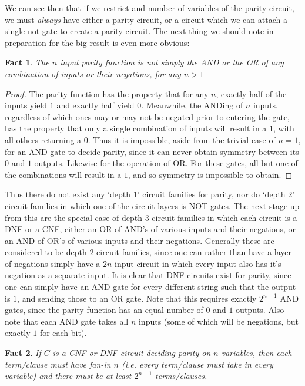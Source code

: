 \documentclass{article}
\theoremstyle{definition}
\theoremstyle{plain}
\theoremstyle{theorem}
\newtheorem{fact}{Fact}[section]
\begin{document}
We can see then that if we restrict and number of variables of the parity circuit, we must \textit{always} have either a parity circuit, or a circuit which we can attach a single not gate to create a parity circuit. The next thing we should note in preparation for the big result is even more obvious: 
\begin{fact}
	The $n$ input parity function is not simply the AND or the OR of any combination of inputs or their negations, for any $n>1$ 
\end{fact}
\begin{proof}
	The parity function has the property that for any $n$, exactly half of the inputs yield $1$ and exactly half yield $0$. Meanwhile, the ANDing of $n$ inputs, regardless of which ones may or may not be negated prior to entering the gate, has the property that only a single combination of inputs will result in a $1$, with all others returning a $0$. Thus it is impossible, aside from the trivial case of $n=1$, for an AND gate to decide parity, since it can never obtain symmetry between its $0$ and $1$ outputs. Likewise for the operation of OR. For these gates, all but one of the combinations will result in a $1$, and so symmetry is impossible to obtain. 
\end{proof}
Thus there do not exist any `depth 1' circuit families for parity, nor do `depth 2' circuit families in which one of the circuit layers is NOT gates. The next stage up from this are the special case of depth $3$ circuit families in which each circuit is a DNF or a CNF, either an OR of AND's of various inputs and their negations, or an AND of OR's of various inputs and their negations. Generally these are considered to be depth $2$ circuit families, since one can rather than have a layer of negations simply have a $2n$ input circuit in which every input also has it's negation as a separate input. It is clear that DNF circuits exist for parity, since one can simply have an AND gate for every different string such that the output is $1$, and sending those to an OR gate. Note that this requires exactly $2^{n-1}$ AND gates, since the parity function has an equal number of $0$ and $1$ outputs. Also note that each AND gate takes all $n$ inputs (some of which will be negations, but exactly $1$ for each bit). 
\begin{fact}
	If $C$ is a CNF or DNF circuit deciding parity on $n$ variables, then each term/clause must have fan-in $n$ (i.e. every term/clause must take in every variable) and there must be at least $2^{n-1}$ terms/clauses.
\end{fact}
\end{document}

